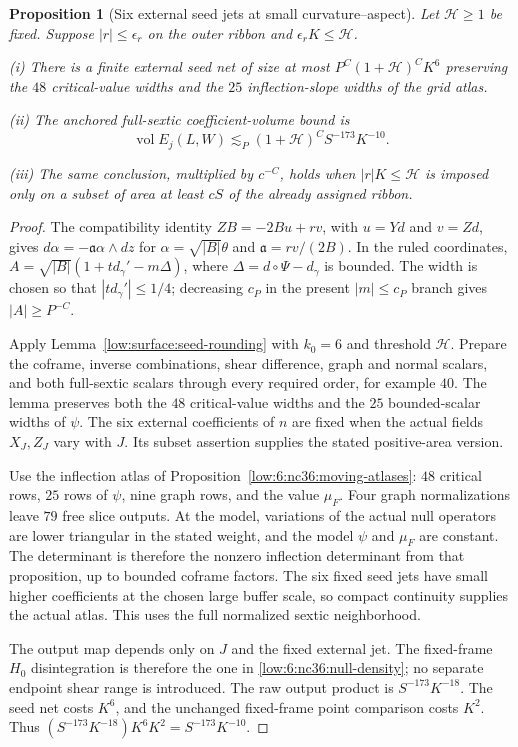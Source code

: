 \documentclass[11pt]{amsart}
\newtheorem{proposition}[theorem]{Proposition}
\theoremstyle{definition}
\theoremstyle{remark}
\numberwithin{equation}{section}
\begin{document}
\begin{proposition}[Six external seed jets at small curvature--aspect]\label{low:6:s36i:small-aspect}
Let $\mathcal H\ge1$ be fixed. Suppose $|r|\le\epsilon_r$ on the outer ribbon and $\epsilon_rK\le\mathcal H$.

\noindent\textup{(i)} There is a finite external seed net of size at most $P^C(1+\mathcal H)^CK^6$ preserving the $48$ critical-value widths and the $25$ inflection-slope widths of the grid atlas.

\noindent\textup{(ii)} The anchored full-sextic coefficient-volume bound is
\[
\operatorname{vol}E_j(L,W)\lesssim_P (1+\mathcal H)^C S^{-173}K^{-10}.
\]

\noindent\textup{(iii)} The same conclusion, multiplied by $c^{-C}$, holds when $|r|K\le\mathcal H$ is imposed only on a subset of area at least $cS$ of the already assigned ribbon. 
\end{proposition}
\begin{proof}
The compatibility identity $ZB=-2Bu+rv$, with $u=Yd$ and $v=Zd$, gives $d\alpha=-\mathfrak a\alpha\wedge dz$ for $\alpha=\sqrt{|B|}\theta$ and $\mathfrak a=rv/(2B)$. In the ruled coordinates, $A=\sqrt{|B|}(1+t d_\gamma'-m\Delta)$, where $\Delta=d\circ\Psi-d_\gamma$ is bounded. The width is chosen so that $|t d_\gamma'|\le1/4$; decreasing $c_P$ in the present $|m|\le c_P$ branch gives $|A|\ge P^{-C}$.

Apply Lemma~\ref{low:surface:seed-rounding} with $k_0=6$ and threshold $\mathcal H$. Prepare the coframe, inverse combinations, shear difference, graph and normal scalars, and both full-sextic scalars through every required order, for example $40$. The lemma preserves both the $48$ critical-value widths and the $25$ bounded-scalar widths of $\psi$. The six external coefficients of $n$ are fixed when the actual fields $X_J,Z_J$ vary with $J$. Its subset assertion supplies the stated positive-area version.

Use the inflection atlas of Proposition~\ref{low:6:nc36:moving-atlases}: $48$ critical rows, $25$ rows of $\psi$, nine graph rows, and the value $\mu_F$. Four graph normalizations leave $79$ free slice outputs. At the model, variations of the actual null operators are lower triangular in the stated weight, and the model $\psi$ and $\mu_F$ are constant. The determinant is therefore the nonzero inflection determinant from that proposition, up to bounded coframe factors. The six fixed seed jets have small higher coefficients at the chosen large buffer scale, so compact continuity supplies the actual atlas. This uses the full normalized sextic neighborhood.

The output map depends only on $J$ and the fixed external jet. The fixed-frame $H_0$ disintegration is therefore the one in \eqref{low:6:nc36:null-density}; no separate endpoint shear range is introduced. The raw output product is $S^{-173}K^{-18}$. The seed net costs $K^6$, and the unchanged fixed-frame point comparison costs $K^2$. Thus $(S^{-173}K^{-18})K^6K^2=S^{-173}K^{-10}$.
\end{proof}
\end{document}
